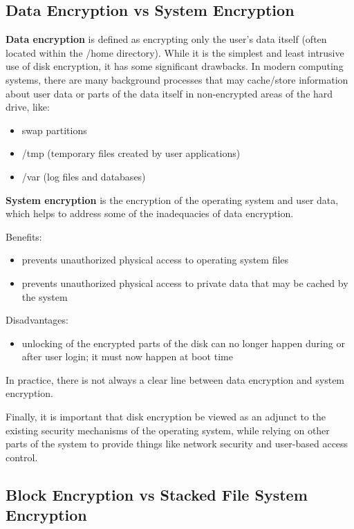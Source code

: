 \subsection{Data Encryption vs System Encryption}
\label{sub-sec:de-vs-se}

\textbf{Data encryption} is defined as encrypting only the user's data itself (often located within the /home directory). While it is the simplest and least intrusive use of disk encryption, it has some significant drawbacks.
In modern computing systems, there are many background processes that may cache/store information about user data or parts of the data itself in non-encrypted areas of the hard drive, like:
\begin{itemize}
\item swap partitions
\item /tmp (temporary files created by user applications)
\item /var (log files and databases)
\end{itemize}


\textbf{System encryption} is the encryption of the operating system and user data, which helps to address some of the inadequacies of data encryption.

Benefits:
\begin{itemize}
\item prevents unauthorized physical access to operating system files
\item prevents unauthorized physical access to private data that may be cached by the system
\end{itemize}
Disadvantages:
\begin{itemize}
\item unlocking of the encrypted parts of the disk can no longer happen during or after user login; it must now happen at boot time
\end{itemize}
In practice, there is not always a clear line between data encryption and system encryption.

Finally, it is important that disk encryption be viewed as an adjunct to the existing security mechanisms of the operating system, while relying on other parts of the system to provide things like network security and user-based access control.

\subsection{Block Encryption vs Stacked File System Encryption}
\label{sub-sec:be-vs-sfse}

